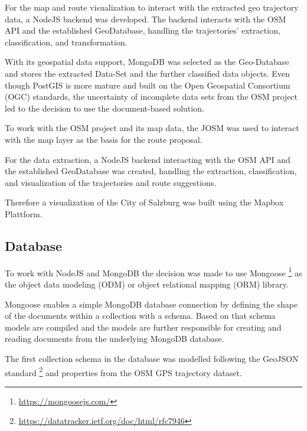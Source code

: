 
For the map and route visualization to interact with the extracted geo trajectory data, a NodeJS backend was developed. The backend interacts with the OSM API and the established GeoDatabase, handling the trajectories' extraction, classification, and transformation.

With its geospatial data support, MongoDB was selected as the Geo-Database and stores the extracted Data-Set and the further classified data objects. Even though PostGIS is more mature and built on the Open Geospatial Consortium (OGC) standards, the uncertainty of incomplete data sets from the OSM project led to the decision to use the document-based solution.

To work with the OSM project and its map data, the JOSM was used to interact with the map layer as the basis for the route proposal. 

For the data extraction, a NodeJS backend interacting with the OSM API and the established GeoDatabase was created, handling the extraction, classification, and visualization of the trajectories and route suggestions.

Therefore a visualization of the City of Salzburg was built using the Mapbox Plattform. 


\subsection{Database}

To work with NodeJS and MongoDB the decision was made to use Mongoose \footnote{\url{https://mongoosejs.com/}} as the object data modeling (ODM) or object relational mapping (ORM) library. \autocite[]{Mardan2014}

Mongoose enables a simple MongoDB database connection by defining the shape of the documents within a collection with a schema. Based on that schema models are compiled and the models are further responsible for creating and reading documents from the underlying MongoDB database.

The first collection schema in the database was modelled following the GeoJSON standard \footnote{\url{https://datatracker.ietf.org/doc/html/rfc7946}} and properties from the OSM GPS trajectory dataset. 


